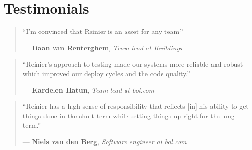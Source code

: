 \documentclass[a4paper,10pt]{article}
\begin{document}

          \section{Testimonials}

            \vspace{5pt}

            \begin{quote}
              “I'm convinced that Reinier is an asset for any team.”

              — \textbf{Daan van Renterghem}, \textit{Team lead at Ibuildings}
            \end{quote}

            \begin{quote}
              “Reinier’s approach to testing made our systems more reliable and robust which improved our deploy cycles and the code quality.”

              — \textbf{Kardelen Hatun}, \textit{Team lead at bol.com}
            \end{quote}

            \begin{quote}
              “Reinier has a high sense of responsibility that reflects [in] his ability to get things done in the short term while setting things up right for the long term.”

              — \textbf{Niels van den Berg}, \textit{Software engineer at bol.com}
            \end{quote}
\end{document}
